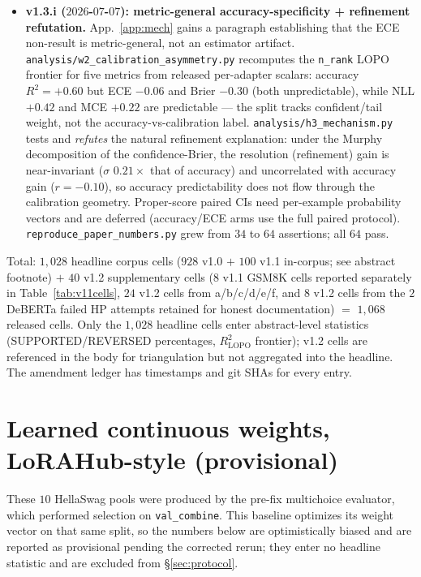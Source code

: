 \documentclass[11pt]{article}
\begin{document}
\begin{itemize}[leftmargin=*]
\item \textbf{v1.3.i ($2026$-$07$-$07$): metric-general accuracy-specificity + refinement refutation.} App.~\ref{app:mech} gains a paragraph establishing that the ECE non-result is metric-general, not an estimator artifact. \texttt{analysis/\allowbreak w2\_\allowbreak calibration\_\allowbreak asymmetry.\allowbreak py} recomputes the \texttt{n\_rank} LOPO frontier for five metrics from released per-adapter scalars: accuracy $R^2{=}{+}0.60$ but ECE $-0.06$ and Brier $-0.30$ (both unpredictable), while NLL $+0.42$ and MCE $+0.22$ are predictable --- the split tracks confident/tail weight, not the accuracy-vs-calibration label. \texttt{analysis/\allowbreak h3\_\allowbreak mechanism.\allowbreak py} tests and \emph{refutes} the natural refinement explanation: under the Murphy decomposition of the confidence-Brier, the resolution (refinement) gain is near-invariant ($\sigma$ $0.21{\times}$ that of accuracy) and uncorrelated with accuracy gain ($r{=}{-}0.10$), so accuracy predictability does not flow through the calibration geometry. Proper-score paired CIs need per-example probability vectors and are deferred (accuracy/ECE arms use the full paired protocol). \texttt{reproduce\_\allowbreak paper\_\allowbreak numbers.\allowbreak py} grew from $34$ to $64$ assertions; all $64$ pass.
\end{itemize}
Total: $1{,}028$ headline corpus cells ($928$ v1.0 $+$ $100$ v1.1 in-corpus; see abstract footnote) $+$ $40$ v1.2 supplementary cells ($8$ v1.1 GSM8K cells reported separately in Table~\ref{tab:v11cells}, $24$ v1.2 cells from a/b/c/d/e/f, and $8$ v1.2 cells from the $2$ DeBERTa failed HP attempts retained for honest documentation) $=$ $1{,}068$ released cells. Only the $1{,}028$ headline cells enter abstract-level statistics (SUPPORTED/REVERSED percentages, $R^2_{\text{LOPO}}$ frontier); v1.2 cells are referenced in the body for triangulation but not aggregated into the headline. The amendment ledger has timestamps and git SHAs for every entry.

\section{Learned continuous weights, LoRAHub-style (provisional)}\label{app:lorahub}
These $10$ HellaSwag pools were produced by the pre-fix multichoice evaluator, which performed selection on \texttt{val\_combine}. This baseline optimizes its weight vector on that same split, so the numbers below are optimistically biased and are reported as provisional pending the corrected rerun; they enter no headline statistic and are excluded from \S\ref{sec:protocol}.
\end{document}
